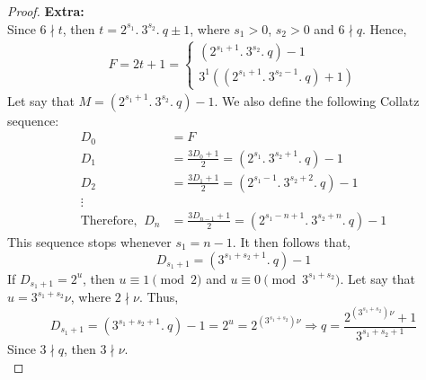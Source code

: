 \documentclass[14pt,a4paper]{article}
\theoremstyle{plain}
\begin{document}
\begin{proof}
    \textbf{Extra:} \\
    
    Since $6\nmid t$, then $t = 2^{s_{1}}.~3^{s_{2}}.~q \pm 1$, where $s_{1}>0$, $s_{2}>0$ and $6\nmid q$. Hence, 
    \begin{align}
        F = 2t+1 = \begin{cases}
         (2^{s_{1}+1}.~3^{s_{2}}.~q) - 1 \\
         3^{1}( (2^{s_{1}+1}.~3^{s_{2}-1}.~q) + 1)
        \end{cases}
    \end{align}
    Let say that $ M = (2^{s_{1}+1}.~3^{s_{2}}.~q) - 1$. We also define the following Collatz sequence:\\
    \begin{align}
        D_{0} & = F  \\
        D_{1} &= \frac{3D_{0}+1}{2}= (2^{s_{1}}. ~3^{s_{2}+1}. ~q) - 1
        \\
        D_{2} &= \frac{3D_{1}+1}{2} = (2^{s_{1}-1}. ~3^{s_{2}+2}. ~q) - 1 
        \\
        \vdots
        \\
        \text{Therefore, } ~D_{n} &= \frac{3D_{n-1}+1}{2} = (2^{s_{1}-n+1}. ~3^{s_{2}+ n}. ~q) - 1
    \end{align}
        This sequence stops whenever $s_{1}= n-1$. It then follows that, 
        \begin{equation}
            D_{s_{1}+1} = (3^{s_{1}+s_{2}+1}.~q)-1
        \end{equation}
        If $D_{s_{1}+1} = 2^{u}$, then $u \equiv 1 \pmod{2}$ and $u \equiv 0 \pmod{3^{s_{1}+s_{2}}}$. Let say that $u = 3^{s_{1}+s_{2}}\nu$, where $2 \nmid \nu$. Thus, 
        \begin{equation}
            D_{s_{1}+1} = (3^{s_{1}+s_{2}+1}.~q)-1 = 2^{u}= 2^{(3^{s_{1}+s_{2}})\nu} \Rightarrow q = \frac{2^{(3^{s_{1}+s_{2}})\nu}+1}{3^{s_{1}+s_{2}+1}}
        \end{equation}  
        Since $3\nmid q$, then $3\nmid \nu $.\\
 
\end{proof} 
\end{document}
